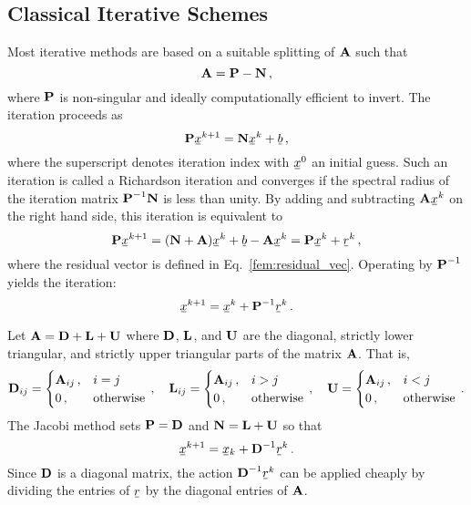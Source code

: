 \documentclass[../doc.tex]{subfiles}
\begin{document}
\subsection{Classical Iterative Schemes}
Most iterative methods are based on a suitable splitting of $\boldsymbol{\mathrm{A}}$ such that 
	\begin{equation}
		\boldsymbol{\mathrm{A}} = \boldsymbol{\mathrm{P}} - \boldsymbol{\mathrm{N}} \,, 
	\end{equation}
where $\boldsymbol{\mathrm{P}}$ is non-singular and ideally computationally efficient to invert. The iteration proceeds as 
	\begin{equation}
		\mat{P} \ubar{x}^{k+1} = \mat{N}\ubar{x}^k + \ubar{b} \,,
	\end{equation}
where the superscript denotes iteration index with $\ubar{x}^0$ an initial guess. 
Such an iteration is called a Richardson iteration and converges if the spectral radius of the iteration matrix $\boldsymbol{\mathrm{P}}^{-1}\boldsymbol{\mathrm{N}}$ is less than unity. By adding and subtracting $\mat{A}\ubar{x}^k$ on the right hand side, this iteration is equivalent to 
	\begin{equation}
		\mat{P}\ubar{x}^{k+1} = (\mat{N} + \mat{A})\ubar{x}^k + \ubar{b} - \mat{A}\ubar{x}^k = \mat{P}\ubar{x}^k + \ubar{r}^k \,, 
	\end{equation}
where the residual vector is defined in Eq.~\ref{fem:residual_vec}. Operating by $\boldsymbol{\mathrm{P}}^{-1}$ yields the iteration: 
	\begin{equation}
		\ubar{x}^{k+1} = \ubar{x}^k + \mat{P}^{-1} \ubar{r}^k \,. 
	\end{equation}

Let $\boldsymbol{\mathrm{A}} = \boldsymbol{\mathrm{D}} + \boldsymbol{\mathrm{L}} + \boldsymbol{\mathrm{U}}$ where $\boldsymbol{\mathrm{D}}$, $\boldsymbol{\mathrm{L}}$, and $\boldsymbol{\mathrm{U}}$ are the diagonal, strictly lower triangular, and strictly upper triangular parts of the matrix $\boldsymbol{\mathrm{A}}$. That is, 
	\begin{equation}
		\boldsymbol{\mathrm{D}}_{ij} = \begin{cases}
			\boldsymbol{\mathrm{A}}_{ij} \,, & i=j \\ 
			0 \,, & \text{otherwise}
		\end{cases} \,, \quad 
		\boldsymbol{\mathrm{L}}_{ij} = \begin{cases}
			\boldsymbol{\mathrm{A}}_{ij} \,, & i>j \\ 
			0\,, & \text{otherwise}
		\end{cases} \,, \quad 
		\boldsymbol{\mathrm{U}} = \begin{cases}
			\boldsymbol{\mathrm{A}}_{ij} \,, & i<j\\
			0\,, & \text{otherwise}
		\end{cases} \,. 
	\end{equation}
The Jacobi method sets $\boldsymbol{\mathrm{P}} = \boldsymbol{\mathrm{D}}$ and $\boldsymbol{\mathrm{N}} = \boldsymbol{\mathrm{L}} + \boldsymbol{\mathrm{U}}$ so that 
	\begin{equation}
		\ubar{x}^{k+1} = \ubar{x}_k + \mat{D}^{-1}\ubar{r}^k \,. 
	\end{equation}
Since $\boldsymbol{\mathrm{D}}$ is a diagonal matrix, the action $\mat{D}^{-1}\ubar{r}^k$ can be applied cheaply by dividing the entries of $\ubar{r}$ by the diagonal entries of $\boldsymbol{\mathrm{A}}$. 
\end{document}
